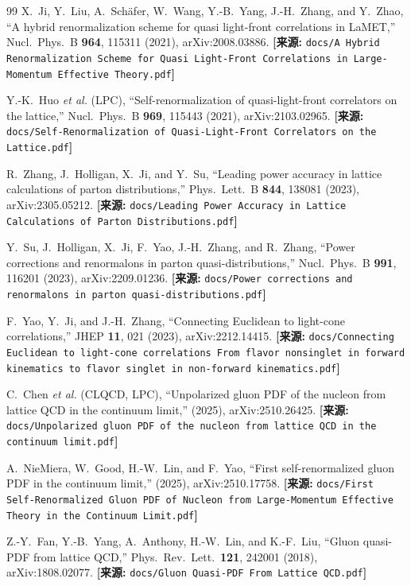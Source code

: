 \documentclass[12pt,a4paper]{ctexart}
\theoremstyle{definition}
\begin{document}
\begin{thebibliography}{99}
X.~Ji, Y.~Liu, A.~Sch\"afer, W.~Wang, Y.-B.~Yang, J.-H.~Zhang, and Y.~Zhao,
``A hybrid renormalization scheme for quasi light-front correlations in LaMET,''
Nucl.\ Phys.\ B \textbf{964}, 115311 (2021), arXiv:2008.03886.
\quad\textbf{[来源:} \texttt{docs/A Hybrid Renormalization Scheme for Quasi Light-Front Correlations in Large-Momentum Effective Theory.pdf}\textbf{]}

Y.-K.~Huo \textit{et al.} (LPC),
``Self-renormalization of quasi-light-front correlators on the lattice,''
Nucl.\ Phys.\ B \textbf{969}, 115443 (2021), arXiv:2103.02965.
\quad\textbf{[来源:} \texttt{docs/Self-Renormalization of Quasi-Light-Front Correlators on the Lattice.pdf}\textbf{]}

R.~Zhang, J.~Holligan, X.~Ji, and Y.~Su,
``Leading power accuracy in lattice calculations of parton distributions,''
Phys.\ Lett.\ B \textbf{844}, 138081 (2023), arXiv:2305.05212.
\quad\textbf{[来源:} \texttt{docs/Leading Power Accuracy in Lattice Calculations of Parton Distributions.pdf}\textbf{]}

Y.~Su, J.~Holligan, X.~Ji, F.~Yao, J.-H.~Zhang, and R.~Zhang,
``Power corrections and renormalons in parton quasi-distributions,''
Nucl.\ Phys.\ B \textbf{991}, 116201 (2023), arXiv:2209.01236.
\quad\textbf{[来源:} \texttt{docs/Power corrections and renormalons in parton quasi-distributions.pdf}\textbf{]}

F.~Yao, Y.~Ji, and J.-H.~Zhang,
``Connecting Euclidean to light-cone correlations,''
JHEP \textbf{11}, 021 (2023), arXiv:2212.14415.
\quad\textbf{[来源:} \texttt{docs/Connecting Euclidean to light-cone correlations From flavor nonsinglet in forward kinematics to flavor singlet in non-forward kinematics.pdf}\textbf{]}

C.~Chen \textit{et al.} (CLQCD, LPC),
``Unpolarized gluon PDF of the nucleon from lattice QCD in the continuum limit,''
(2025), arXiv:2510.26425.
\quad\textbf{[来源:} \texttt{docs/Unpolarized gluon PDF of the nucleon from lattice QCD in the continuum limit.pdf}\textbf{]}

A.~NieMiera, W.~Good, H.-W.~Lin, and F.~Yao,
``First self-renormalized gluon PDF in the continuum limit,''
(2025), arXiv:2510.17758.
\quad\textbf{[来源:} \texttt{docs/First Self-Renormalized Gluon PDF of Nucleon from Large-Momentum Effective Theory in the Continuum Limit.pdf}\textbf{]}

Z.-Y.~Fan, Y.-B.~Yang, A.~Anthony, H.-W.~Lin, and K.-F.~Liu,
``Gluon quasi-PDF from lattice QCD,''
Phys.\ Rev.\ Lett.\ \textbf{121}, 242001 (2018), arXiv:1808.02077.
\quad\textbf{[来源:} \texttt{docs/Gluon Quasi-PDF From Lattice QCD.pdf}\textbf{]}


\end{thebibliography}
\end{document}
